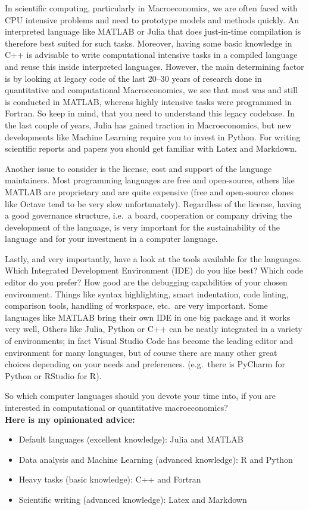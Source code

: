 \begin{enumerate}
In scientific computing, particularly in Macroeconomics,
  we are often faced with CPU intensive problems
  and need to prototype models and methods quickly.
An interpreted language like MATLAB or Julia that does just-in-time compilation
  is therefore best suited for such tasks.
Moreover, having some basic knowledge in C++ is advisable
  to write computational intensive tasks in a compiled language
  and reuse this inside interpreted languages.
However, the main determining factor is by looking at legacy code of the last 20--30 years of research done
  in quantitative and computational Macroeconomics,
  we see that most was and still is conducted in MATLAB,
  whereas highly intensive tasks were programmed in Fortran.
So keep in mind, that you need to understand this legacy codebase.
In the last couple of years, Julia has gained traction in Macroeconomics,
  but new developments like Machine Learning require you to invest in Python.
For writing scientific reports and papers you should get familiar with Latex and Markdown.

Another issue to consider is the license, cost and support of the language maintainers.
Most programming languages are free and open-source,
  others like MATLAB are proprietary and are quite expensive
  (free and open-source clones like Octave tend to be very slow unfortunately).
Regardless of the license, having a good governance structure,
  i.e.\ a board, cooperation or company driving the development of the language,
  is very important for the sustainability of the language
  and for your investment in a computer language.

Lastly, and very importantly, have a look at the tools available for the languages.
Which Integrated Development Environment (IDE) do you like best?
Which code editor do you prefer?
How good are the debugging capabilities of your chosen environment.
Things like syntax highlighting, smart indentation, code linting, comparison tools,
  handling of workspace, etc.\ are very important.
Some languages like MATLAB bring their own IDE in one big package and it works very well,
Others like Julia, Python or C++ can be neatly integrated in a variety of environments;
  in fact Visual Studio Code has become the leading editor and environment for many languages,
  but of course there are many other great choices depending on your needs and preferences.
  (e.g.\ there is PyCharm for Python or RStudio for R).

So which computer languages should you devote your time into,
  if you are interested in computational or quantitative macroeconomics?
\\
\textbf{Here is my opinionated advice:}
\begin{itemize}
\item Default languages (excellent knowledge): Julia and MATLAB
\item Data analysis and Machine Learning (advanced knowledge): R and Python
\item Heavy tasks (basic knowledge): C++ and Fortran
\item Scientific writing (advanced knowledge): Latex and Markdown
\end{itemize}

\end{enumerate}